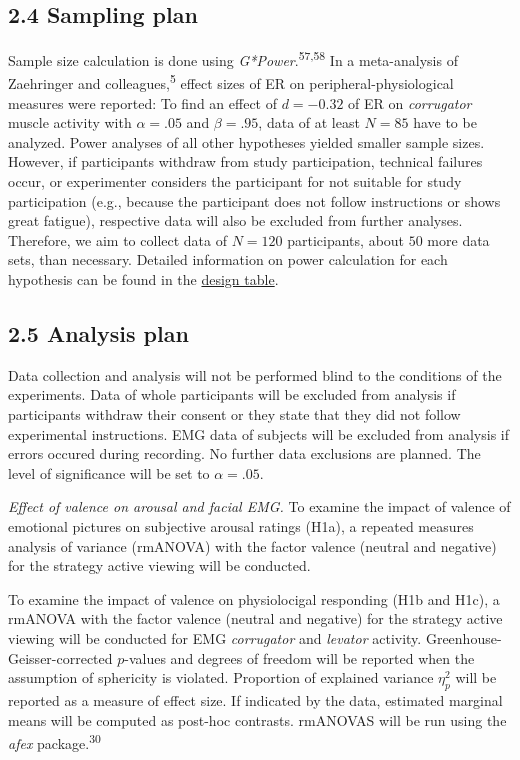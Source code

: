 \documentclass[
  english,
  man,floatsintext]{apa6}
\begin{document}
\hypertarget{sampling-plan}{%
\subsection{2.4 Sampling plan}\label{sampling-plan}}

Sample size calculation is done using \emph{G*Power}.\textsuperscript{57,58}
In a meta-analysis of Zaehringer and colleagues,\textsuperscript{5} effect sizes of ER on peripheral-physiological measures were reported:
To find an effect of \(d=-0.32\) of ER on \emph{corrugator} muscle activity with \(\alpha=.05\) and \(\beta=.95\), data of at least \(N=85\) have to be analyzed.
Power analyses of all other hypotheses yielded smaller sample sizes.
However, if participants withdraw from study participation, technical failures occur, or experimenter considers the participant for not suitable for study participation (e.g., because the participant does not follow instructions or shows great fatigue), respective data will also be excluded from further analyses.
Therefore, we aim to collect data of \(N=120\) participants, about \(50%
\) more data sets, than necessary.
Detailed information on power calculation for each hypothesis can be found in the \protect\hyperlink{DesignTable}{design table}.

\hypertarget{analysis-plan}{%
\subsection{2.5 Analysis plan}\label{analysis-plan}}

Data collection and analysis will not be performed blind to the conditions of the experiments.
Data of whole participants will be excluded from analysis if participants withdraw their consent or they state that they did not follow experimental instructions.
EMG data of subjects will be excluded from analysis if errors occured during recording.
No further data exclusions are planned.
The level of significance will be set to \(\alpha=.05\).

\emph{Effect of valence on arousal and facial EMG.}
To examine the impact of valence of emotional pictures on subjective arousal ratings (H1a), a repeated measures analysis of variance (rmANOVA) with the factor valence (neutral and negative) for the strategy active viewing will be conducted.

To examine the impact of valence on physiolocigal responding (H1b and H1c), a rmANOVA with the factor valence (neutral and negative) for the strategy active viewing will be conducted for EMG \emph{corrugator} and \emph{levator} activity.
Greenhouse-Geisser-corrected \(p\)-values and degrees of freedom will be reported when the assumption of sphericity is violated.
Proportion of explained variance \(\eta_{p}^{2}\) will be reported as a measure of effect size.
If indicated by the data, estimated marginal means will be computed as post-hoc contrasts.
rmANOVAS will be run using the \emph{afex} package.\textsuperscript{30}
\end{document}
